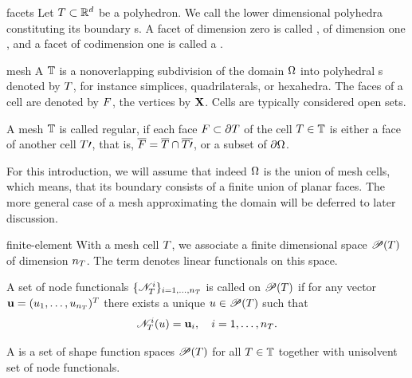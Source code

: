 \begin{Definition}{facets}
  Let $T\subset \mathbb R^d$ be a polyhedron. We call the lower
  dimensional polyhedra constituting its boundary s. A
  facet of dimension zero is called , of dimension one
  , and a facet of codimension one is called a
  .
\end{Definition}

\begin{Definition}{mesh}
  A  $\mathbb T$ is a nonoverlapping subdivision of the
  domain $\Omega$ into polyhedral s denoted by $T$,
  for instance simplices, quadrilaterals, or hexahedra. The
  faces of a cell are denoted by $F$, the
  vertices by $\mathbf X$. Cells are typically considered open sets.

  A mesh $\mathbb T$ is called regular, if each face
  $F \subset \partial T$ of the cell $T\in\mathbb T$ is either a
  face of another cell $T\prime$, that is,
  $\overline{F} = \overline{T} \cap \overline{T\prime}$,
  or a subset of $\partial\Omega$.
\end{Definition}

\begin{remark}
  For this introduction, we will assume that indeed $\Omega$ is the
  union of mesh cells, which means, that its boundary consists of a
  finite union of planar faces. The more general case of a mesh
  approximating the domain will be deferred to later discussion.
\end{remark}

\begin{Definition}{finite-element}
  With a mesh cell $T$, we associate a finite dimensional
   space $\mathscr P(T)$ of dimension
  $n_T$. The term  denotes linear
  functionals on this space.

  A set of node functionals $\{\mathscr N_T^i\}_{i=1,\dots,n_T}$ is called
   on $\mathscr P(T)$ if for any vector
  $\mathbf u = (u_1,\dots,u_{n_T})^T$ there exists a unique
  $u\in \mathscr P(T)$ such that
  \begin{gather}
    \mathscr N_T^i(u) = \mathbf u_i,\quad i=1,\dots,n_T.
  \end{gather}

  A  is a set of shape function spaces
  $\mathscr P(T)$ for all $T\in\mathbb T$ together with
  unisolvent set of node functionals.
\end{Definition}

